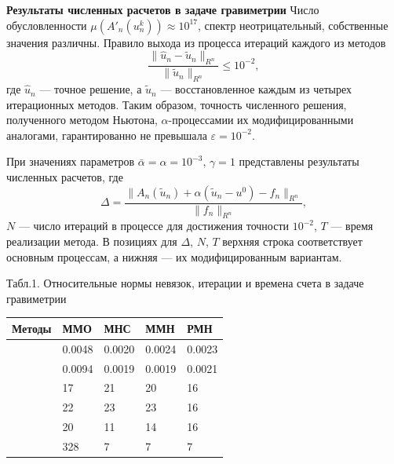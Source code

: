 \documentclass[10pt,pdf, mathserif, hyperref={unicode}]{beamer}
\begin{document}
\begin{frame}{\small\textbf{Результаты численных расчетов в задаче гравиметрии}}
	Число обусловленности $\mu(A'_n(u_n^k))\approx 10^{17}$, спектр неотрицательный, собственные значения различны. Правило выхода из процесса итераций каждого из методов
	$$\frac{\|\hat{u}_n-\tilde{u}_n\|_{R^n}}{\|\tilde{u}_n\|_{R^n}}\le 10^{-2},$$
	где $\hat{u}_n$ --- точное решение, а $\tilde{u}_n$ --- восстановленное каждым из четырех итерационных методов. Таким образом, точность численного решения, полученного методом Ньютона, $\alpha$-процессамии их модифицированными аналогами, гарантированно не превышала $\varepsilon=10^{-2}$.
\end{frame}
\begin{frame}
	При значениях параметров $\bar\alpha=\alpha=10^{-3}$, $\gamma=1$ представлены результаты численных расчетов, где
	$$\Delta=\frac{\|A_n(\tilde{u}_n)+\alpha(\tilde{u}_n-u^0)-f_n\|_{R^n}}{\|f_n\|_{R^n}},$$
	$N$ --- число итераций в процессе для достижения точности $10^{-2}$, $T$ --- время реализации метода. В позициях для $\Delta$, $N$, $T$ верхняя строка соответствует основным процессам, а нижняя --- их модифицированным вариантам.
	\begin{table}
		\centering
		{\scriptsize Табл.1. Относительные нормы невязок, итерации и времена счета в задаче гравиметрии}
		\begin{tabular}{|p{}|p{}|p{}|p{}|p{}|}
			\hline
			\rule{0cm}{0.5cm}
			Методы & ММО & МНС & ММН & РМН \\ \hline
			\rule{0cm}{0.5cm}
			\multirow{$\Delta$} & 0.0048 & 0.0020 & 0.0024 & 0.0023	 \\ \cline{2-5} 
			\rule{0cm}{0.5cm}
			&  0.0094   & 0.0019    &  0.0019   &  0.0021   \\ \hline
			\rule{0cm}{0.5cm}
			\multirow{$N$} & 17  &  21   &   20  &  16    \\ \cline{2-5}
			\rule{0cm}{0.5cm}
			&  22   &   23  &  23   &  16   \\ \hline
			\rule{0cm}{0.5cm}
			\multirow{$T$ (сек)}    &  20   &  11   &  14  & 16    \\ \cline{2-5}
			\rule{0cm}{0.5cm}
			& 328    & 7    &  7   &   7  \\ \hline
		\end{tabular}
	\end{table}
\end{frame}
\end{document}
